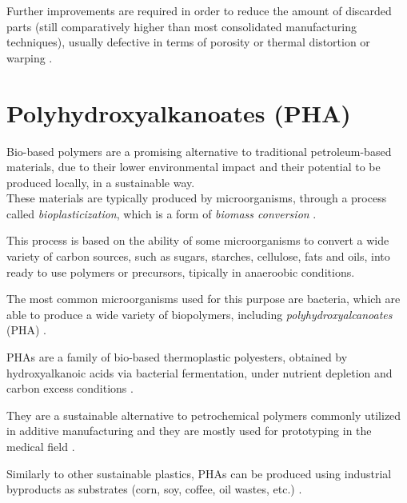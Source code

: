 \documentclass{article}
\begin{document}
    Further improvements are required in order to reduce the amount of discarded parts (still comparatively 
    higher than most consolidated manufacturing techniques), usually defective in terms of porosity or 
    thermal distortion or warping \autocite*{Padovano_SLS_Review}. \\ 

    
    \clearpage

    \section{Polyhydroxyalkanoates (PHA)  \label{PHA_in_general}}

    Bio-based polymers are a promising alternative to traditional petroleum-based materials, due to their lower environmental impact and 
    their potential to be produced locally, in a sustainable way. \\ 

    These materials are typically produced by microorganisms, through a process called \textit{bioplasticization}, 
    which is a form of \textit{biomass conversion} \autocite*{Kovalcik_PHA_Review}. 

    This process is based on the ability of some microorganisms to convert a wide variety of carbon sources, such as sugars, 
    starches, cellulose, fats and oils, into ready to use polymers or precursors, tipically in anaeroobic conditions. 

    The most common microorganisms used for this purpose are bacteria, which are able to produce a wide variety of 
    biopolymers, including \textit{polyhydroxyalcanoates} (PHA) \autocite*{Kovalcik_PHA_Review}. 

    PHAs are a family of bio-based thermoplastic polyesters, obtained by hydroxyalkanoic acids via bacterial fermentation, under 
    nutrient depletion and carbon excess conditions \autocites{Kovalcik_PHA_Review,Messori_Bondioli_PHAs}. 

    They are a sustainable alternative to petrochemical polymers commonly utilized in 
    additive manufacturing and they are mostly used for prototyping in the medical field \autocites{Kovalcik_PHA_Review,Messori_Bondioli_PHAs}. 

    Similarly to other sustainable plastics, PHAs can be produced using industrial byproducts as substrates (corn, soy, coffee, oil wastes, etc.)
    \autocite{Kovalcik_PHA_Review}. \\ 
\end{document}
